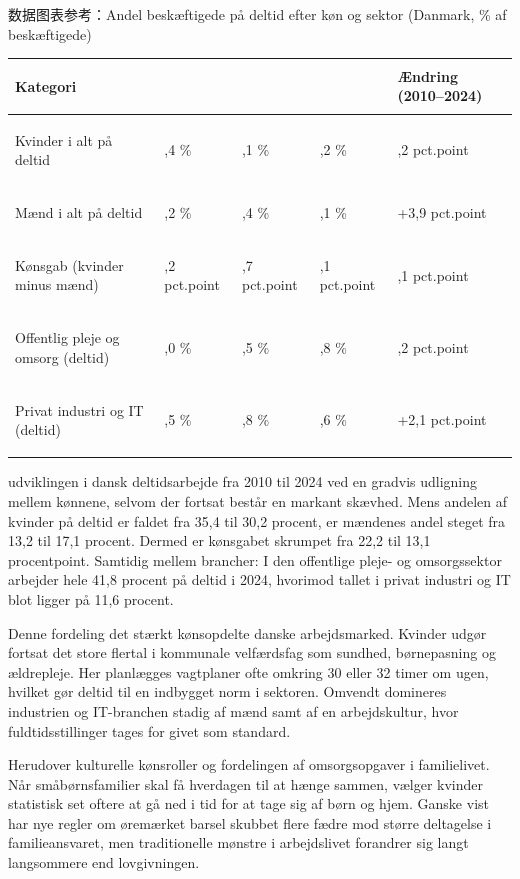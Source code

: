 \begin{tipbox}{数据图表参考：Andel beskæftigede på deltid efter køn og sektor (Danmark, \% af beskæftigede)}
\renewcommand{\arraystretch}{1.22}
{\small
\begin{tabularx}{\linewidth}{@{} >{\bfseries\raggedright\arraybackslash}p{5.5cm} >{\centering\arraybackslash}X >{\centering\arraybackslash}X >{\centering\arraybackslash}X >{\centering\arraybackslash}X @{}}
\toprule
Kategori & 2010 & 2018 & 2024 & Ændring (2010--2024) \\
\midrule
Kvinder i alt på deltid & 35,4 \% & 32,1 \% & 30,2 \% & -5,2 pct.point \\
Mænd i alt på deltid & 13,2 \% & 15,4 \% & 17,1 \% & +3,9 pct.point \\
Kønsgab (kvinder minus mænd) & 22,2 pct.point & 16,7 pct.point & 13,1 pct.point & -9,1 pct.point \\
\midrule
Offentlig pleje og omsorg (deltid) & 48,0 \% & 44,5 \% & 41,8 \% & -6,2 pct.point \\
Privat industri og IT (deltid) & 9,5 \% & 10,8 \% & 11,6 \% & +2,1 pct.point \\
\bottomrule
\end{tabularx}
}
\end{tipbox}

 udviklingen i dansk deltidsarbejde fra 2010 til 2024 ved en gradvis udligning mellem kønnene, selvom der fortsat består en markant skævhed. Mens andelen af kvinder på deltid er faldet fra 35,4 til 30,2 procent, er mændenes andel steget fra 13,2 til 17,1 procent. Dermed er kønsgabet skrumpet fra 22,2 til 13,1 procentpoint. Samtidig  mellem brancher: I den offentlige pleje- og omsorgssektor arbejder hele 41,8 procent på deltid i 2024, hvorimod tallet i privat industri og IT blot ligger på 11,6 procent.

Denne fordeling  det stærkt kønsopdelte danske arbejdsmarked. Kvinder udgør fortsat det store flertal i kommunale velfærdsfag som sundhed, børnepasning og ældrepleje. Her planlægges vagtplaner ofte omkring 30 eller 32 timer om ugen, hvilket gør deltid til en indbygget norm i sektoren. Omvendt domineres industrien og IT-branchen stadig af mænd samt af en arbejdskultur, hvor fuldtidsstillinger tages for givet som standard.

Herudover  kulturelle kønsroller og fordelingen af omsorgsopgaver i familielivet. Når småbørnsfamilier skal få hverdagen til at hænge sammen, vælger kvinder statistisk set oftere at gå ned i tid for at tage sig af børn og hjem. Ganske vist har nye regler om øremærket barsel skubbet flere fædre mod større deltagelse i familieansvaret, men traditionelle mønstre i arbejdslivet forandrer sig langt langsommere end lovgivningen.

